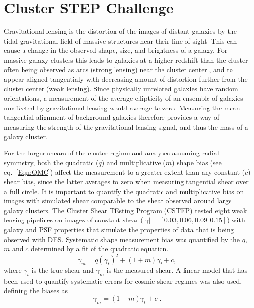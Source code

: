 \documentclass[useAMS,usenatbib]{mn2e}
\begin{document}
\section{Cluster STEP Challenge}
Gravitational lensing is the distortion of the images of
distant galaxies by the tidal gravitational field of massive structures near
their line of sight. This can
cause a change in the observed shape, size, and brightness of a
galaxy. For massive galaxy clusters this leads to galaxies at a
higher redshift than the cluster often being
observed as arcs (strong lensing) near the cluster center , and to
appear aligned tangentialy with decreasing amount of distortion further from
the cluster center (weak lensing). Since physically unrelated galaxies 
have random orientations, a measurement of the average ellipticity of
an ensemble of galaxies unaffected by gravitational lensing would average
to zero. Measuring the mean tangential alignment of background galaxies therefore provides a way of
measuring the strength of the gravitational lensing signal, and thus the
mass of a galaxy cluster. 

For the larger shears of the cluster regime and analyses assuming radial symmetry, both the quadratic ($q$) and
multiplicative ($m$) shape bias (see eq.~\ref{Eqn:QMC})
affect the measurement to a greater extent than any
constant ($c$) shear bias, since the latter averages to zero when measuring
tangential shear over a full circle. It is
important to quantify the quadratic and multiplicative bias on images
with simulated shear comparable to the shear observed around large
galaxy clusters. The Cluster Shear TEsting Program (CSTEP) tested eight weak lensing pipelines on images of constant shear
($|\gamma| = [0.03, 0.06, 0.09, 0.15]$) with galaxy and PSF properties that simulate the properties
of data that is being observed with DES. Systematic shape measurement bias was quantified by the $q$, $m$ and $c$
determined by a fit of the quadratic equation.
\begin{equation}\label{Eqn:QMC}
\gamma_m = q (\gamma_t)^2 + (1+m) \gamma_t + c,
\end {equation}
where $\gamma_t$ is the true shear and $\gamma_m$ is the measured
shear. A linear model that has been used to quantify systematic errors
for cosmic shear regimes was also used, defining the biases as \citep{STEP1}
\begin{equation}\label{Eqn:MC}
\gamma_m = (1+m) \gamma_t + c \; .
\end {equation}
\end{document}
